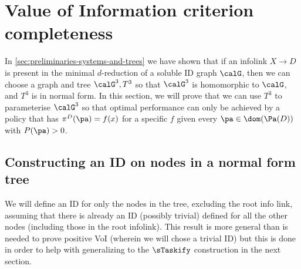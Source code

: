 





\section{Value of Information criterion completeness} \label{sec:model-definition}

In \autoref{sec:preliminaries-systems-and-trees}
we have shown that if an infolink $X \to D$ is present in the minimal $d$-reduction of 
a soluble ID graph $\calG$, 
then we can choose a graph and tree $\calG^3, T^3$
so that $\calG^3$ is homomorphic to $\calG$, and $T^3$ is in normal form.
In this section, we will prove that 
we can use $T^3$ to parameterise $\calG^3$
so that optimal performance can only be 
achieved by a policy that has
$\pi^D(\pa)=f(x)$
for a specific $f$
given every $\pa\in \dom(\Pa(D))$ with $P(\pa)>0$.






\subsection{Constructing an ID on nodes in a normal form tree}
We will define an ID for only the nodes in the tree, excluding the root info link, assuming that there is already an ID (possibly trivial) defined for all the other nodes (including those in the root infolink). 
This result is more general than is needed to prove positive VoI (wherein we will chose a trivial ID)
but this is done in order to help with generalizing to the $\sTaskify$ construction in the next section.~


\newcommand{\sGoriginalInModelConstruction}{\sG^0}
\newcommand{\sGNewInModelConstruction}{\sG^3}
\newcommand{\MoriginalInModelConstruction}{M^0}
\newcommand{\MnewInModelConstruction}{M^3}


